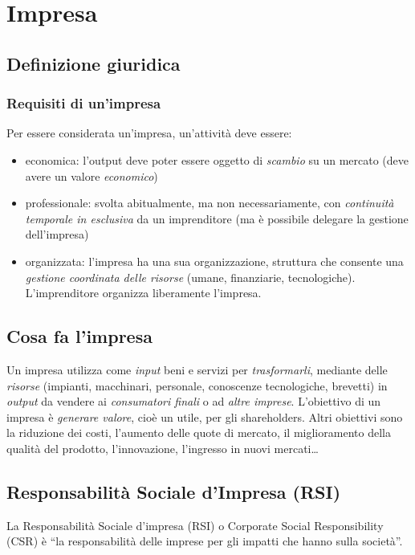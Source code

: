 \chapter{Impresa}

\section{Definizione giuridica}

\subsection{Requisiti di un'impresa}
Per essere considerata un'\gls{impresa}, un'attività deve essere:
\begin{itemize}
    \item economica: l’output deve poter essere oggetto di \emph{scambio} su un 
    mercato (deve avere un valore \emph{economico})
    \item professionale: svolta abitualmente, ma non necessariamente, con
    \emph{continuità temporale in esclusiva} da un \gls{imprenditore} (ma è
    possibile delegare la gestione dell’\gls{impresa})
    \item organizzata: l’impresa ha una sua organizzazione, struttura che
    consente una \emph{gestione coordinata delle risorse} (umane, finanziarie,
    tecnologiche). L’imprenditore organizza liberamente l’impresa.
\end{itemize}

\section{Cosa fa l'impresa}

Un impresa utilizza come \emph{input} beni e servizi per \emph{trasformarli},
mediante delle \emph{risorse} (impianti, macchinari, personale, conoscenze
tecnologiche, brevetti) in \emph{output} da vendere ai \emph{consumatori finali}
o ad \emph{altre imprese}. L'obiettivo di un impresa è \emph{generare valore},
cioè un \gls{utile}, per gli \glspl{shareholder}. Altri obiettivi sono la
riduzione dei costi, l'aumento delle quote di mercato, il miglioramento della
qualità del prodotto, l'innovazione, l'ingresso in nuovi mercati\dots

\section{Responsabilità Sociale d'Impresa (RSI)}
La Responsabilità Sociale d’impresa (RSI) o Corporate Social Responsibility
(CSR) è ``la responsabilità delle imprese per gli impatti che hanno sulla
società''.

